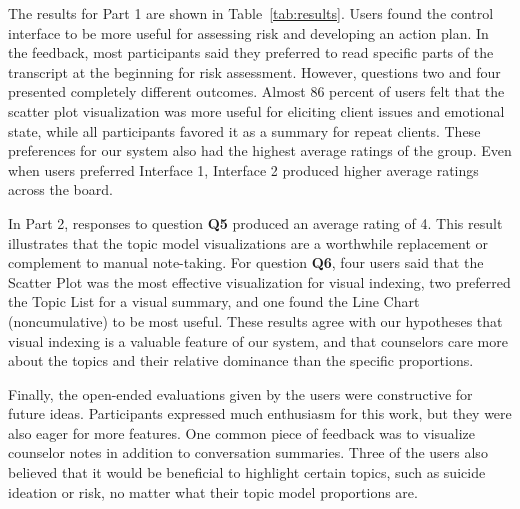 The results for Part 1 are shown in Table~\ref{tab:results}. Users found the control interface
to be more useful for assessing risk and developing an action plan. In the feedback,
most participants said they preferred to read specific parts of the transcript at the
beginning for risk assessment. However, questions two and four presented completely
different outcomes. Almost 86 percent of users felt that the scatter plot visualization
was more useful for eliciting client issues and emotional state, while all participants
favored it as a summary for repeat clients. These preferences for our system also
had the highest average ratings of the group. Even when users preferred Interface 1,
Interface 2 produced higher average ratings across the board.

In Part 2, responses to question \textbf{Q5} produced an average rating of 4. This result
illustrates that the topic model visualizations are a worthwhile replacement or
complement to manual note-taking. For question \textbf{Q6}, four users said that the Scatter
Plot was the most effective visualization for visual indexing, two preferred the Topic
List for a visual summary, and one found the Line Chart (noncumulative) to be most
useful. These results agree with our hypotheses that visual indexing is a valuable
feature of our system, and that counselors care more about the topics and their relative
dominance than the specific proportions.

Finally, the open-ended evaluations given by the users were constructive for future
ideas. Participants expressed much enthusiasm for this work, but they were also eager
for more features. One common piece of feedback was to visualize counselor notes in
addition to conversation summaries. Three of the users also believed that it would
be beneficial to highlight certain topics, such as suicide ideation or risk, no matter
what their topic model proportions are.
